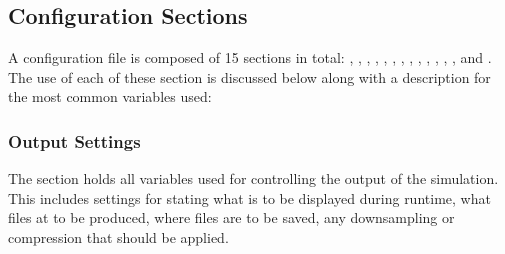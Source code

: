 \documentclass[letterpaper,10pt,english]{sphinxmanual}
\begin{document}
\subsection{Configuration Sections}
\label{\detokenize{usage/configuration:configuration-sections}}
\sphinxAtStartPar
A configuration file is composed of 15 sections in total: , , , ,
, , , , , , , ,
,  and . The use of each of these section is discussed below along with a
description for the most common variables used:


\subsubsection{Output Settings}
\label{\detokenize{usage/configuration:output-settings}}
\sphinxAtStartPar
The  section holds all variables used for controlling the output of the simulation. This includes
settings for stating what is to be displayed during runtime, what files at to be produced, where files are to be saved,
any down\sphinxhyphen{}sampling or compression that should be applied.
\end{document}
